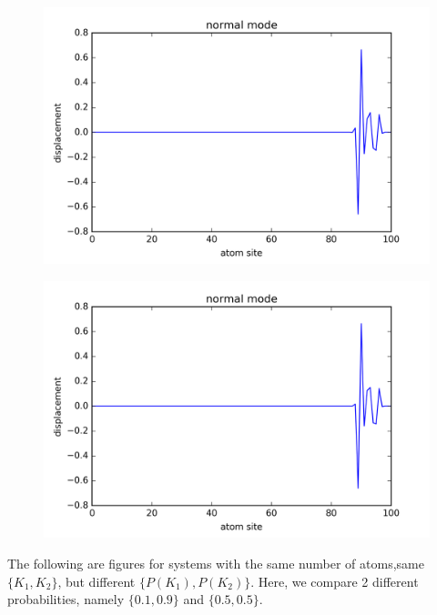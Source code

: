 \begin{figure}[!htbh]
\centering
\begin{minipage}{.45\textwidth}
  \centering
  \includegraphics[width=1.1\linewidth]{Harmonic_spring_ratio/spr_N_103sp_10_0p_0_576th.png}
  \label{fig:spring_N_103m_10.0_p_0_5_76th}
\end{minipage}\qquad
\begin{minipage}{.45\textwidth}
  \centering
  \includegraphics[width=1.1\linewidth]{Harmonic_spring_ratio/spr_N_103sp_20_0p_0_576th.png}
  \label{fig:spring_N_103m_20.0_p_0_5_51st}
\end{minipage}
\end{figure}

\newpage
The following are figures for systems with the same number of atoms,same $\{K_1, K_2\}$, but different $\{P(K_1), P(K_2)\}$. Here, we compare 2 different probabilities, namely $\{0.1, 0.9\}$ and $\{0.5, 0.5\}$. 

